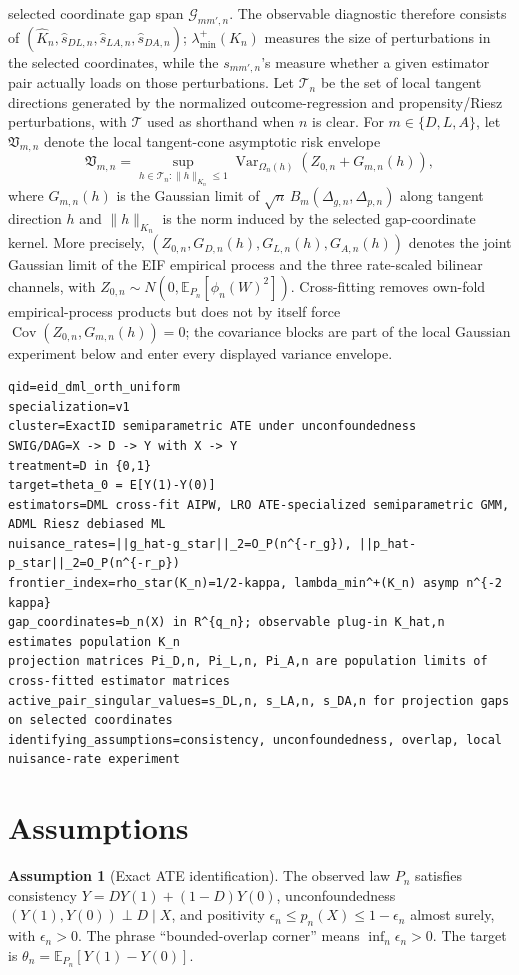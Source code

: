 \documentclass[11pt]{article}
\newcommand{\E}{\mathbb{E}}
\theoremstyle{definition}
\newtheorem{assumption}{Assumption}
\theoremstyle{plain}
\theoremstyle{remark}
\begin{document}
selected coordinate gap span \(\mathcal{G}_{mm',n}\).  The observable diagnostic
therefore consists of \((\hat K_n,\hat s_{DL,n},\hat s_{LA,n},\hat s_{DA,n})\);
\(\lambda_{\min}^+(K_n)\) measures the size of perturbations in the selected
coordinates, while the \(s_{mm',n}\)'s measure whether a given estimator pair
actually loads on those perturbations.
Let \(\mathcal{T}_n\) be the set of local tangent directions generated by the
normalized outcome-regression and propensity/Riesz perturbations, with
\(\mathcal{T}\) used as shorthand when \(n\) is clear.  For
\(m\in\{D,L,A\}\), let \(\mathfrak V_{m,n}\) denote the local
tangent-cone asymptotic risk envelope
\[
\mathfrak V_{m,n}
=\sup_{h\in\mathcal{T}_n:\|h\|_{K_n}\le 1}
\operatorname{Var}_{\Omega_n(h)}\!\left(Z_{0,n}+G_{m,n}(h)\right),
\]
where \(G_{m,n}(h)\) is the Gaussian limit of
\(\sqrt n\,B_m(\Delta_{g,n},\Delta_{p,n})\) along tangent direction \(h\) and
\(\|h\|_{K_n}\) is the norm induced by the selected gap-coordinate kernel.  More
precisely, \((Z_{0,n},G_{D,n}(h),G_{L,n}(h),G_{A,n}(h))\) denotes the joint
Gaussian limit of the EIF empirical process and the three rate-scaled bilinear
channels, with \(Z_{0,n}\sim N(0,\E_{P_n}[\phi_n(W)^2])\).  Cross-fitting
removes own-fold empirical-process products but does not by itself force
\(\operatorname{Cov}(Z_{0,n},G_{m,n}(h))=0\); the covariance blocks are part of
the local Gaussian experiment below and enter every displayed variance envelope.

\begin{verbatim}
qid=eid_dml_orth_uniform
specialization=v1
cluster=ExactID semiparametric ATE under unconfoundedness
SWIG/DAG=X -> D -> Y with X -> Y
treatment=D in {0,1}
target=theta_0 = E[Y(1)-Y(0)]
estimators=DML cross-fit AIPW, LRO ATE-specialized semiparametric GMM, ADML Riesz debiased ML
nuisance_rates=||g_hat-g_star||_2=O_P(n^{-r_g}), ||p_hat-p_star||_2=O_P(n^{-r_p})
frontier_index=rho_star(K_n)=1/2-kappa, lambda_min^+(K_n) asymp n^{-2 kappa}
gap_coordinates=b_n(X) in R^{q_n}; observable plug-in K_hat,n estimates population K_n
projection matrices Pi_D,n, Pi_L,n, Pi_A,n are population limits of cross-fitted estimator matrices
active_pair_singular_values=s_DL,n, s_LA,n, s_DA,n for projection gaps on selected coordinates
identifying_assumptions=consistency, unconfoundedness, overlap, local nuisance-rate experiment
\end{verbatim}

\section{Assumptions}
\begin{assumption}[Exact ATE identification]\label{ass:identification}
The observed law \(P_n\) satisfies consistency \(Y=DY(1)+(1-D)Y(0)\),
unconfoundedness \((Y(1),Y(0))\perp D\mid X\), and positivity
\(\epsilon_n\le p_n(X)\le 1-\epsilon_n\) almost surely, with
\(\epsilon_n>0\).  The phrase ``bounded-overlap corner'' means
\(\inf_n\epsilon_n>0\).  The target is
\(\theta_n=\E_{P_n}[Y(1)-Y(0)]\).
\end{assumption}
\end{document}
